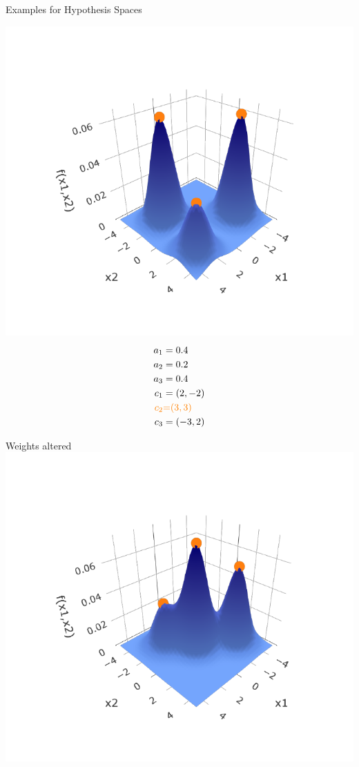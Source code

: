\documentclass[11pt,compress,t,notes=noshow, xcolor=table]{beamer}
\begin{document}
\begin{vbframe}{Examples for Hypothesis Spaces}
\begin{minipage}{0.33\textwidth}
\begin{center}
      \includegraphics[width=1\textwidth]{figure/hs-rbf-network-3d-2.pdf}
      \begin{equation*}
        \begin{split}
          a_1 &= 0.4 \\
          a_2 &= 0.2 \\
          a_3 &= 0.4 \\
          c_1 &= (2,-2) \\
          \textcolor{orange}{c_2} & \textcolor{orange}{=}
          \textcolor{orange}{(3,3)} \\
          c_3 &= (-3,2)
        \end{split}
      \end{equation*}
    \end{center}
\end{minipage}%
\begin{minipage}{0.33\textwidth}
  \begin{center}
      Weights altered
      \includegraphics[width=1\textwidth]{figure/hs-rbf-network-3d-3.pdf}

\end{center}
\end{minipage}
\end{vbframe}
\end{document}
